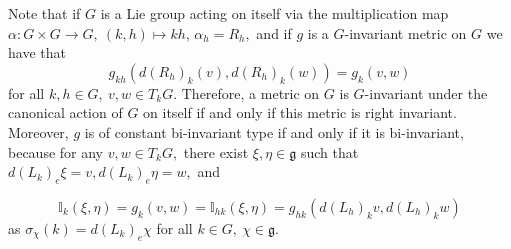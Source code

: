 \documentclass[12pt, letterpaper, reqno]{amsart}
\theoremstyle{definition}
\theoremstyle{plain}
\theoremstyle{remark}
\begin{document}
Note that if $ G $ is a Lie group acting on itself via the multiplication map $ \alpha: G\times G \rightarrow G,\ (k,h) \mapsto kh $, $ \alpha_h = R_h, $ and if $ g $ is a $ G $-invariant metric on $ G $ we have that 
$$ g_{kh} \left( d(R_h)_k(v), d(R_h)_k(w) \right) = g_k(v,w) $$ 
for all $ k,h\in G,\ v,w\in T_kG. $ Therefore, a metric on $ G $ is $ G $-invariant under the canonical action of $ G $ on itself if and only if this metric is right invariant. Moreover, $ g $ is of constant bi-invariant type if and only if it is bi-invariant, because for any $ v,w\in T_kG, $  there exist $ \xi,\eta\in \mathfrak{g} $ such that $ d(L_k)_e\xi=v, d(L_k)_e\eta=w, $ and

$$\mathbb{I}_k(\xi,\eta)= g_k(v,w)= \mathbb{I}_{hk}(\xi,\eta)= g_{hk} \left( d(L_h)_kv, d(L_h)_k w \right) $$
as $ \sigma_\chi(k) = d(L_k)_e\chi $ for all $ k\in G, \ \chi\in \mathfrak{g}. $ 
\end{document}
